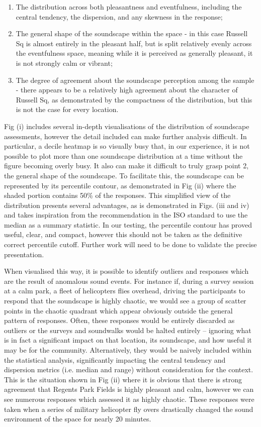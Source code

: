 \begin{enumerate}
  \item The distribution across both pleasantness and eventfulness, including the central tendency, the dispersion, and any skewness in the response;
  \item The general shape of the soundscape within the space - in this case Russell Sq is almost entirely in the pleasant half, but is split relatively evenly across the eventfulness space, meaning while it is perceived as generally pleasant, it is not strongly calm or vibrant;
  \item The degree of agreement about the soundscape perception among the sample - there appears to be a relatively high agreement about the character of Russell Sq, as demonstrated by the compactness of the distribution, but this is not the case for every location.
\end{enumerate}

Fig (i) includes several in-depth visualisations of the distribution of soundscape assessments, however the detail included can make further analysis difficult. In particular, a decile heatmap is so visually busy that, in our experience, it is not possible to plot more than one soundscape distribution at a time without the figure becoming overly busy. It also can make it difficult to truly grasp point 2, the general shape of the soundscape. To facilitate this, the soundscape can be represented by its  percentile contour, as demonstrated in Fig (ii) where the shaded portion contains 50\% of the responses. This simplified view of the distribution presents several advantages, as is demonstrated in Figs. (iii and iv) and takes inspiration from the recommendation in the ISO standard to use the median as a summary statistic. In our testing, the  percentile contour has proved useful, clear, and compact, however this should not be taken as the definitive correct percentile cutoff. Further work will need to be done to validate the precise presentation.

When visualised this way, it is possible to identify outliers and responses which are the result of anomalous sound events. For instance if, during a survey session at a calm park, a fleet of helicopters flies overhead, driving the participants to respond that the soundscape is highly chaotic, we would see a group of scatter points in the chaotic quadrant which appear obviously outside the general pattern of responses. Often, these responses would be entirely discarded as outliers or the surveys and soundwalks would be halted entirely -- ignoring what is in fact a significant impact on that location, its soundscape, and how useful it may be for the community. Alternatively, they would be naively included within the statistical analysis, significantly impacting the central tendency and dispersion metrics (i.e. median and range) without consideration for the context. This is the situation shown in Fig (ii) where it is obvious that there is strong agreement that Regents Park Fields is highly pleasant and calm, however we can see numerous responses which assessed it as highly chaotic. These responses were taken when a series of military helicopter fly overs drastically changed the sound environment of the space for nearly 20 minutes.

